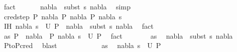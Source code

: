 \begin{isabellebody}
\ fact\ \isanewline
\ \ \isamarkupfalse%
\ \isamarkupfalse%
\ {\isachardoublequoteopen}nabla{}\ {\isasymTurnstile}\ {\isacharparenleft}{\kern0pt}subst\ s{}{\isacharparenright}{\kern0pt}\ nabla{}{\isachardoublequoteclose}\ \isamarkupfalse%
\ simp\ \isanewline
{}\isamarkupfalse%
\isanewline
\ \ \isamarkupfalse%
\ {\isacharparenleft}{\kern0pt}cred{\isacharunderscore}{\kern0pt}step\ P{}\ nabla{}\ P{}\ nabla{}\ P{}\ nabla{}\ s{}{\isacharparenright}{\kern0pt}\isanewline
\ \ \isamarkupfalse%
\ IH{\isacharcolon}{\kern0pt}\ {\isachardoublequoteopen}{\isacharparenleft}{\kern0pt}nabla{}{\isacharcomma}{\kern0pt}\ s{}{\isacharparenright}{\kern0pt}\ {\isasymin}\ U\ P{}\ {\isasymLongrightarrow}\ nabla{}\ {\isasymTurnstile}\ {\isacharparenleft}{\kern0pt}subst\ s{}{\isacharparenright}{\kern0pt}\ nabla{}{\isachardoublequoteclose}\ \isamarkupfalse%
\ fact\isanewline
\ \ \isamarkupfalse%
\ as{\isacharcolon}{\kern0pt}\ {\isachardoublequoteopen}P{}\ {\isasymturnstile}\ nabla{}\ {\isasymrightarrow}\ P{}{\isachardoublequoteclose}\ {\isachardoublequoteopen}{\isacharparenleft}{\kern0pt}nabla{}{\isacharcomma}{\kern0pt}\ s{}{\isacharparenright}{\kern0pt}\ {\isasymin}\ U\ P{}{\isachardoublequoteclose}\ \isamarkupfalse%
\ fact{\isacharplus}{\kern0pt}\ \isanewline
\ \ \isanewline
\ \ \isamarkupfalse%
\ as\ \isamarkupfalse%
\ {\isachardoublequoteopen}nabla{}\ {\isasymTurnstile}\ {\isacharparenleft}{\kern0pt}subst\ s{}{\isacharparenright}{\kern0pt}\ nabla{}{\isachardoublequoteclose}\ \isamarkupfalse%
\ P{}{\isacharunderscore}{\kern0pt}to{\isacharunderscore}{\kern0pt}P{}{\isacharunderscore}{\kern0pt}cred\ \isamarkupfalse%
\ blast\ \ \ \ \isanewline
\ \ \isamarkupfalse%
\ \isanewline
\ \ \isamarkupfalse%
\ as\ \isamarkupfalse%
\ {\isachardoublequoteopen}{\isacharparenleft}{\kern0pt}nabla{}{\isacharcomma}{\kern0pt}\ s{}{\isacharparenright}{\kern0pt}\ {\isasymin}\ U\ P{}{\isachardoublequoteclose}\ \isamarkupfalse%

\end{isabellebody}
